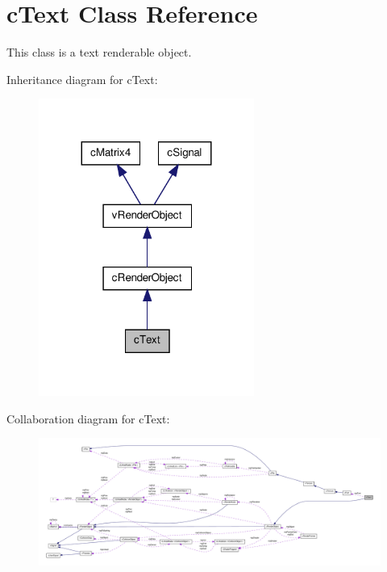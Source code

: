 \hypertarget{classc_text}{
\section{cText Class Reference}
\label{classc_text}
}


This class is a text renderable object.  




Inheritance diagram for cText:
\nopagebreak
\begin{figure}[H]
\begin{center}
\leavevmode
\includegraphics[width=200pt]{classc_text__inherit__graph}
\end{center}
\end{figure}


Collaboration diagram for cText:
\nopagebreak
\begin{figure}[H]
\begin{center}
\leavevmode
\includegraphics[width=400pt]{classc_text__coll__graph}
\end{center}
\end{figure}
